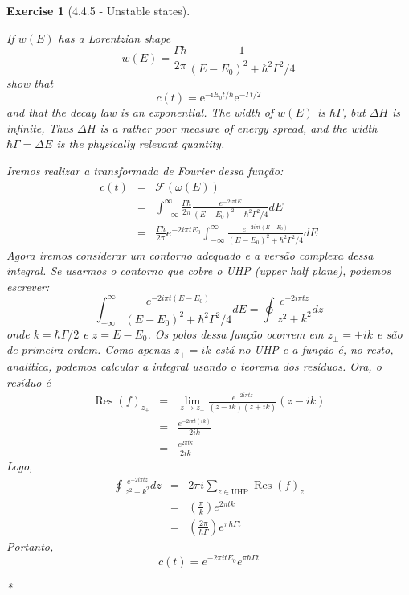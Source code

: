 \documentclass[12pt]{article}
\def\be{\begin{equation}}
\def\ee{\end{equation}}
\def\bea{\begin{eqnarray*}}
\def\eea{\end{eqnarray*}}
\def\f{\frac}
\def\l{\left}
\def\r{\right}
\newtheorem{exercise}{Exercise}
\DeclareMathOperator{\Res}{Res}
\begin{document}
\begin{exercise}[4.4.5 - Unstable states]
\begin{exercises}
\begin{multianswer}
			\end{multianswer}
		
			\item If $w(E)$ has a Lorentzian shape
			$$
			w(E)=\frac{\Gamma \hbar}{2 \pi} \frac{1}{\left(E-E_{0}\right)^{2}+\hbar^{2} \Gamma^{2} / 4}
			$$
			show that
			$$
			c(t)=\mathrm{e}^{-\mathrm{i} E_{0} t / \hbar} \mathrm{e}^{-\Gamma t / 2}
			$$
			and that the decay law is an exponential. The width of $w(E)$ is $\hbar \Gamma$, but $\Delta H$ is infinite, Thus $\Delta H$ is a rather poor measure of energy spread, and the width $\hbar \Gamma=\Delta E$ is the physically relevant quantity.
			\begin{multianswer}[true]
				Iremos realizar a transformada de Fourier dessa função:
				\bea
					c(t) &=& \mathcal{F}\l(\omega(E)\r) \\
						&=&  \int_{-\infty}^{\infty} \frac{\Gamma \hbar}{2 \pi} \frac{e^{-2i\pi tE}}{\left(E-E_{0}\right)^{2}+\hbar^{2} \Gamma^{2} / 4} dE \\
						&=& \f{\Gamma\hbar}{2\pi}e^{-2i\pi tE_0} \int_{-\infty}^{\infty} \frac{e^{-2i\pi t(E-E_0)}}{\left(E-E_{0}\right)^{2}+\hbar^{2} \Gamma^{2} / 4} dE 
				\eea
				Agora iremos considerar um contorno adequado e a versão complexa dessa integral. Se usarmos o contorno que cobre o UHP (upper half plane), podemos escrever:
				\be
					\int_{-\infty}^{\infty} \frac{e^{-2i\pi t(E-E_0)}}{\left(E-E_{0}\right)^{2}+\hbar^{2} \Gamma^{2} / 4} dE  = \oint \f{e^{-2i\pi tz}}{z^2 + k^2} dz
				\ee
				onde $k=\hbar\Gamma/2$ e $z=E-E_0$. Os polos dessa função ocorrem em $z_\pm=\pm ik$ e são de primeira ordem. Como apenas $z_+=ik$ está no UHP e a função é, no resto, analítica, podemos calcular a integral usando o teorema dos resíduos. Ora, o resíduo é
				\bea
					\Res(f)_{z_+} &=& \lim_{z\to z_+} \f{e^{-2i\pi tz}}{(z-ik)(z+ik)} (z-ik) \\ 
							&=& \f{e^{-2i\pi t (ik)}}{2ik} \\
							&=& \f{e^{2\pi tk}}{2ik}
				\eea
				Logo,
				\bea
					\oint \f{e^{-2i\pi tz}}{z^2 + k^2} dz &=& 2\pi i \sum_{z\in\text{UHP}} \Res(f)_z \\
						&=& \l(\f{\pi}{k}\r) e^{2\pi tk} \\
						&=& \l(\f{2\pi}{\hbar\Gamma}\r) e^{\pi\hbar\Gamma t}
				\eea
				Portanto,
				\be
					c(t) = e^{-2\pi i tE_0}e^{\pi \hbar\Gamma t}
				\ee
				
				
				
				*
				
			\end{multianswer}
		\end{exercises}
	\end{exercise}
\end{document}
